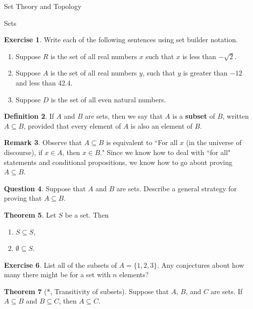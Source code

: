\documentclass[11pt]{article}
\theoremstyle{definition}
\newtheorem{theorem}{Theorem}[section]
\newtheorem{definition}[theorem]{Definition}
\newtheorem{exercise}[theorem]{Exercise}
\newtheorem{remark}[theorem]{Remark}
\newtheorem{question}[theorem]{Question}
\begin{document}
\begin{section}{Set Theory and Topology}
\begin{subsection}{Sets}
\begin{exercise}
Write each of the following sentences using set builder notation.
\begin{enumerate}
\item Suppose $R$ is the set of all real numbers $x$ such that $x$ is less than $-\sqrt{2}$. 
\item Suppose $A$ is the set of all real numbers $y$, such that $y$ is greater than $-12$ and less than 42.4.
\item Suppose $D$ is the set of all even natural numbers.
\end{enumerate}
\end{exercise}

\begin{definition}
If $A$ and $B$ are sets, then we say that $A$ is a \textbf{subset} of $B$, written $A\subseteq B$, provided that every element of $A$ is also an element of $B$.
\end{definition}

\begin{remark}
Observe that $A\subseteq B$ is equivalent to ``For all $x$ (in the universe of discourse), if $x\in A$, then $x\in B$."  Since we know how to deal with ``for all" statements and conditional propositions, we know how to go about proving $A\subseteq B$.
\end{remark}

\begin{question}
Suppose that $A$ and $B$ are sets.  Describe a general strategy for proving that $A\subseteq B$.
\end{question}

\begin{theorem}
Let $S$ be a set.  Then
\begin{enumerate}
\item $S\subseteq S$,
\item $\emptyset \subseteq S$.
\end{enumerate}
\end{theorem}

\begin{exercise}
List all of the subsets of $A=\{1,2,3\}$.  Any conjectures about how many there might be for a set with $n$ elements?
\end{exercise}

\begin{theorem}[*, Transitivity of subsets]
Suppose that $A$, $B$, and $C$ are sets.  If $A\subseteq B$ and $B\subseteq C$, then $A\subseteq C$.
\end{theorem}


\end{subsection}
\end{section}
\end{document}
